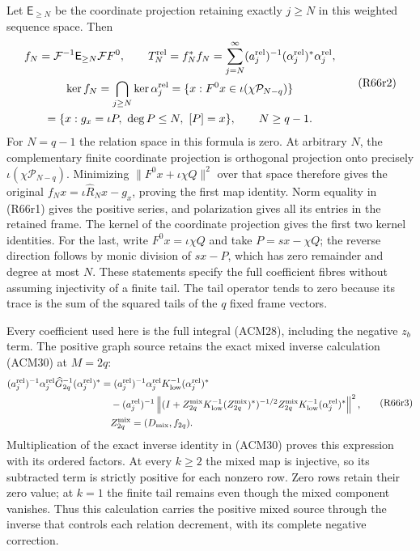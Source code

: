 Let $\mathsf E_{\geq N}$ be the coordinate projection retaining
exactly $j\geq N$ in this weighted sequence space. Then
\[
\begin{gathered}
 f_N=\mathcal F^{-1}\mathsf E_{\geq N}\mathcal F F^0,
 \qquad
 T_N^{\rm rel}=f_N^*f_N
       =\sum_{j=N}^{\infty}(a_j^{\rm rel})^{-1}
                    (\alpha_j^{\rm rel})^*\alpha_j^{\rm rel},\\
 \ker f_N=\bigcap_{j\geq N}\ker\alpha_j^{\rm rel}
 =\{x:F^0x\in\iota(\chi\mathcal P_{N-q})\}\\
 =\{x:g_x=\iota P,\ \deg P\leq N,\ [P]=x\},
 \qquad N\geq q-1.
\end{gathered}\tag{R66r2}
\]
For $N=q-1$ the relation space in this formula is zero.
At arbitrary $N$, the complementary finite coordinate projection
is orthogonal projection onto precisely
$\iota(\chi\mathcal P_{N-q})$. Minimizing
$\|F^0x+\iota\chi Q\|^2$ over that space therefore gives
the original $f_Nx=\iota\widehat R_Nx-g_x$, proving the first
map identity. Norm equality in (R66r1) gives the positive series,
and polarization gives all its entries in the retained frame.
The kernel of the coordinate projection gives the first two
kernel identities. For the last, write
$F^0x=\iota\chi Q$ and take $P=sx-\chi Q$; the reverse
direction follows by monic division of $sx-P$, which has zero
remainder and degree at most $N$. These statements specify the
full coefficient fibres without assuming injectivity of a
finite tail. The tail operator tends to zero because its trace
is the sum of the squared tails of the $q$ fixed frame vectors.

Every coefficient used here is the full integral (ACM28),
including the negative $z_b$ term. The positive graph source
retains the exact mixed inverse calculation (ACM30) at $M=2q$:
\[
\begin{aligned}
 (a_j^{\rm rel})^{-1}\alpha_j^{\rm rel}
                \widehat G_{2q}^{-1}(\alpha_j^{\rm rel})^*
 &=(a_j^{\rm rel})^{-1}\alpha_j^{\rm rel}
                    K_{\rm low}^{-1}(\alpha_j^{\rm rel})^*\\
 &\quad-(a_j^{\rm rel})^{-1}\left\|
 (I+Z_{2q}^{\rm mix}K_{\rm low}^{-1}(Z_{2q}^{\rm mix})^*)^{-1/2}
 Z_{2q}^{\rm mix}K_{\rm low}^{-1}(\alpha_j^{\rm rel})^*
                                    \right\|^2,\\
 &\quad Z_{2q}^{\rm mix}=(D_{\rm mix},f_{2q}).
\end{aligned}\tag{R66r3}
\]
Multiplication of the exact inverse identity in (ACM30) proves
this expression with its ordered factors. At every $k\geq2$
the mixed map is injective, so its subtracted term is strictly
positive for each nonzero row. Zero rows retain their zero
value; at $k=1$ the finite tail remains even though the mixed
component vanishes. Thus this calculation carries the positive
mixed source through the inverse that controls each relation
decrement, with its complete negative correction.

